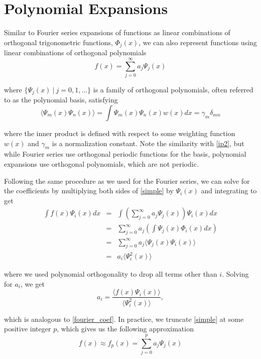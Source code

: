\documentclass[11pt]{article}
\numberwithin{equation}{section}
\begin{document}
\section{Polynomial Expansions}

Similar to Fourier series expansions of functions as linear combinations of orthogonal trigonometric functions, $\Phi_j(x)$, we can also represent functions using linear combinations of orthogonal polynomials
\begin{equation}
f(x) = \sum_{j=0}^{\infty}  a_j \Psi_j(x) \label{simple}
\end{equation}

where $\{ \Psi_j(x) \ | \ j = 0, 1, ... \}$ is a family of orthogonal polynomials, often referred to as the polynomial basis, satisfying
\begin{equation}
\langle \Psi_m(x) \Psi_n(x) \rangle = \int \Psi_m(x) \Psi_n(x) w(x) dx = \gamma_m \delta_{mn} \label{orth_poly}
\end{equation}

where the inner product is defined with respect to some weighting function $w(x)$ and $\gamma_m$ is a normalization constant. Note the similarity with \eqref{ip2}, but while Fourier series use orthogonal periodic functions for the basis, polynomial expansions use orthogonal polynomials, which are not periodic.

\qquad Following the same procedure as we used for the Fourier series, we can solve for the coefficients by multiplying both sides of \eqref{simple} by $\Psi_i(x)$ and integrating to get
\begin{eqnarray*}
\int f(x) \Psi_i(x) dx & = & \int \left( \sum_{j = 0}^{\infty} a_j \Psi_j(x) \right) \Psi_i(x) dx \\
& = & \sum_{j = 0}^{\infty}  a_j  \left( \int \Psi_j(x) \Phi_i(x) dx \right) \\
& = & \sum_{j = 0}^{\infty}  a_j  \langle \Psi_j(x) \Psi_i(x) \rangle \\
& = & a_i  \langle \Psi_i^2(x) \rangle
\end{eqnarray*}

where we used polynomial orthogonality to drop all terms other than $i$. Solving for $a_i$, we get
\begin{equation}
a_i = \frac{\langle f(x) \Psi_i(x) \rangle }{\langle \Psi_i^2(x) \rangle}, \label{pc_coef}
\end{equation}

which is analogous to \eqref{fourier_coef}. In practice, we truncate \eqref{simple} at some positive integer $p$, which gives us the following approximation
\begin{equation}
f(x) \approx f_p(x) = \sum_{j=0}^{p}  a_j \Psi_j(x) \label{pce_trunc}
\end{equation}
\end{document}
